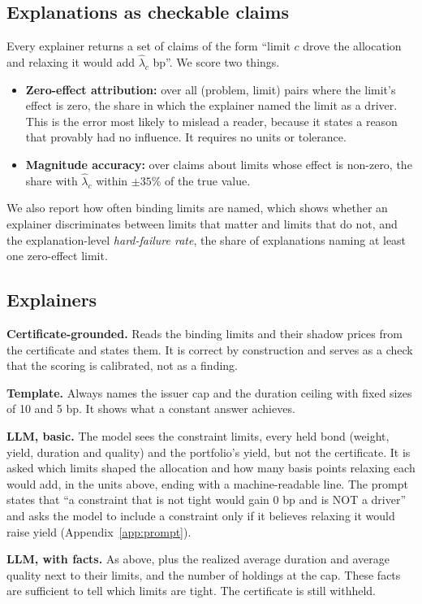 \subsection{Explanations as checkable claims}
Every explainer returns a set of claims of the form ``limit $c$ drove the
allocation and relaxing it would add $\hat\lambda_c$ bp''. We score two things.
\begin{itemize}\itemsep1pt
\item \textbf{Zero-effect attribution:} over all (problem, limit) pairs where the
limit's effect is zero, the share in which the explainer named the limit as a
driver. This is the error most likely to mislead a reader, because it states a
reason that provably had no influence. It requires no units or tolerance.
\item \textbf{Magnitude accuracy:} over claims about limits whose effect is
non-zero, the share with $\hat\lambda_c$ within $\pm35\%$ of the true value.
\end{itemize}
We also report how often binding limits are named, which shows whether an
explainer discriminates between limits that matter and limits that do not, and
the explanation-level \emph{hard-failure rate}, the share of explanations naming
at least one zero-effect limit.

\subsection{Explainers}
\textbf{Certificate-grounded.} Reads the binding limits and their shadow prices
from the certificate and states them. It is correct by construction and serves
as a check that the scoring is calibrated, not as a finding.

\textbf{Template.} Always names the issuer cap and the duration ceiling with
fixed sizes of 10 and 5 bp. It shows what a constant answer achieves.

\textbf{LLM, basic.} The model sees the constraint limits, every held bond
(weight, yield, duration and quality) and the portfolio's yield, but not the
certificate. It is asked which limits shaped the allocation and how many basis
points relaxing each would add, in the units above, ending with a
machine-readable line. The prompt states that ``a constraint that is not tight
would gain 0 bp and is NOT a driver'' and asks the model to include a
constraint only if it believes relaxing it would raise yield
(Appendix~\ref{app:prompt}).

\textbf{LLM, with facts.} As above, plus the realized average duration and
average quality next to their limits, and the number of holdings at the cap.
These facts are sufficient to tell which limits are tight. The certificate is
still withheld.


